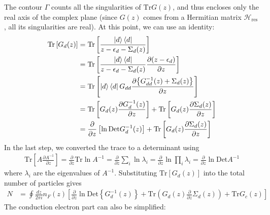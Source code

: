 \documentclass[twoside]{report}
\numberwithin{equation}{section}
\begin{document}
The contour \(\Gamma\) counts all the singularities of \(\text{Tr} G(z)\), and thus encloses only the real axis of the complex plane (since \(G(z)\) comes from a Hermitian matrix \(\mathcal{H}_\text{res}\), all its singularities are real).
At this point, we can use an identity:
\begin{equation}\begin{aligned}
	\text{Tr}\left[G_{d}(z)\right] &= \text{Tr}\left[ \frac{\ket{d}\bra{d}}{z - \epsilon_d - \Sigma_d(z)}\right]\\
				       &= \text{Tr}\left[ \frac{\ket{d}\bra{d}}{z - \epsilon_d - \Sigma_d(z)}\frac{\partial{\left(z - \epsilon_d\right)}}{\partial{z}} \right]\\
				       &= \text{Tr}\left[ \ket{d}\bra{d}G_{dd}\frac{\partial{\left\{G_{dd}^{-1}(z) + \Sigma_d(z)\right\}}}{\partial{z}} \right]\\
				       &= \text{Tr}\left[ G_{d}(z)\frac{\partial{G_{d}^{-1}(z)}}{\partial{z}} \right] + \text{Tr}\left[ G_{d}(z)\frac{\partial{\Sigma_d(z)}}{\partial{z}} \right]\\
				       &= \frac{\partial{}}{\partial{z}}\left[\ln \text{Det}G_{d}^{-1}(z)\right] + \text{Tr}\left[ G_{d}(z)\frac{\partial{\Sigma_d(z)}}{\partial{z}} \right]\\
\end{aligned}\end{equation}
In the last step, we converted the trace to a determinant using
\begin{equation}\begin{aligned}
	\text{Tr}\left[A \frac{\partial{A^{-1}}}{\partial{z}}\right] = \frac{\partial{}}{\partial{z}}\text{Tr}\ln A^{-1} =\frac{\partial{}}{\partial{z}}\sum_i \ln \lambda_i = \frac{\partial{}}{\partial{z}}\ln \prod_i \lambda_i = \frac{\partial{}}{\partial{z}}\ln \text{Det}A^{-1}
\end{aligned}\end{equation}
where \(\lambda_i\) are the eigenvalues of \(A^{-1}\). Substituting \(\text{Tr}\left[G_d(z)\right] \) into the total number of particles gives
\begin{equation}\begin{aligned}
	N  &= \oint \frac{dz}{2\pi i}n_F(z) \left[\frac{\partial{}}{\partial{z}} \ln \text{Det} \left\{G^{-1}_d(z)\right\} + \text{Tr} \left( G_d(z) \frac{\partial{}}{\partial{z}}\Sigma_d(z) \right) + \text{Tr}G_c(z)\right]
\end{aligned}\end{equation}
The conduction electron part can also be simplified:
\end{document}
